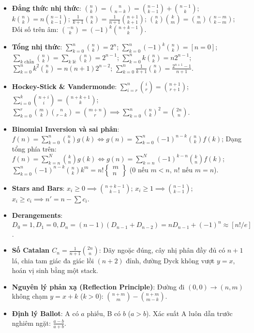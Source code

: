 \begin{itemize}
    \item \textbf{Đẳng thức nhị thức}: $\binom{n}{k} = \binom{n}{n-k} = \binom{n-1}{k-1} + \binom{n-1}{k}$; $k \binom{n}{k} = n \binom{n-1}{k-1}$; $\frac{1}{k+1}\binom{n}{k} = \frac{1}{n+1}\binom{n+1}{k+1}$; $\binom{n}{k} \binom{k}{m} = \binom{n}{m} \binom{n-m}{k-m}$; Đối số trên âm: $\binom{-n}{k} = (-1)^k \binom{n+k-1}{k}$.
    \item \textbf{Tổng nhị thức}: $\sum_{k=0}^n \binom{n}{k} = 2^n$; $\sum_{k=0}^n (-1)^k \binom{n}{k} = [n = 0]$; $\sum_{k \text{ chẵn}} \binom{n}{k} = \sum_{k \text{ lẻ}} \binom{n}{k} = 2^{n-1}$; $\sum_{k=0}^n k \binom{n}{k} = n 2^{n-1}$; $\sum_{k=0}^n k^2 \binom{n}{k} = n(n+1) 2^{n-2}$; $\sum_{k=0}^n \frac{1}{k+1}\binom{n}{k} = \frac{2^{n+1}-1}{n+1}$.
    \item \textbf{Hockey-Stick \& Vandermonde}: $\sum_{i=r}^n \binom{i}{r} = \binom{n+1}{r+1}$; $\sum_{i=0}^k \binom{n+i}{i} = \binom{n+k+1}{k}$; $\sum_{k=0}^r \binom{m}{k} \binom{n}{r-k} = \binom{m+n}{r} \implies \sum_{k=0}^n \binom{n}{k}^2 = \binom{2n}{n}$.
    \item \textbf{Binomial Inversion và sai phân}: $f(n) = \sum_{k=0}^n \binom{n}{k} g(k) \iff g(n) = \sum_{k=0}^n (-1)^{n-k} \binom{n}{k} f(k)$; Dạng tổng phía trên: $f(n) = \sum_{k=n}^N \binom{k}{n} g(k) \iff g(n) = \sum_{k=n}^N (-1)^{k-n} \binom{k}{n} f(k)$; $\sum_{k=0}^n (-1)^{n-k} \binom{n}{k} k^m = n! \left\{ \begin{matrix} m \\ n \end{matrix} \right\}$ ($0$ nếu $m<n$, $n!$ nếu $m=n$).
    \item \textbf{Stars and Bars}: $x_i \ge 0 \implies \binom{n + k - 1}{k - 1}$; $x_i \ge 1 \implies \binom{n - 1}{k - 1}$; $x_i \ge c_i \implies n' = n - \sum c_i$.
    \item \textbf{Derangements}: $D_0 = 1, D_1 = 0, D_n = (n - 1)(D_{n-1} + D_{n-2}) = n D_{n-1} + (-1)^n \approx [n! / e]$.
    \item \textbf{Số Catalan $C_n = \frac{1}{n+1}\binom{2n}{n}$}: Dãy ngoặc đúng, cây nhị phân đầy đủ có $n+1$ lá, chia tam giác đa giác lồi $(n+2)$ đỉnh, đường Dyck không vượt $y=x$, hoán vị sinh bằng một stack.
    \item \textbf{Nguyên lý phản xạ (Reflection Principle)}: Đường đi $(0,0)\to(n,m)$ không chạm $y = x + k$ ($k > 0$): $\binom{n + m}{m} - \binom{n + m}{m - k}$.
    \item \textbf{Định lý Ballot}: A có $a$ phiếu, B có $b$ ($a>b$). Xác suất A luôn dẫn trước nghiêm ngặt: $\frac{a - b}{a + b}$.

\end{itemize}
